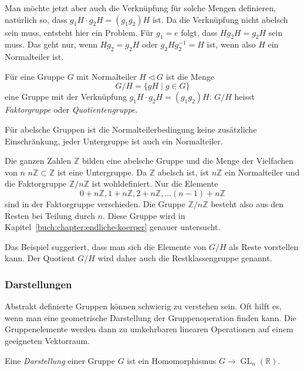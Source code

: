 Man möchte jetzt aber auch die Verknüpfung für solche Mengen 
definieren, natürlich so, dass $g_1H\cdot g_2H = (g_1g_2)H$ ist.
Da die Verknüpfung nicht abelsch sein muss, entsteht hier
ein Problem.
Für $g_1=e$ folgt, dass $Hg_2H=g_2H$ sein muss.
Das geht nur, wenn $Hg_2=g_2H$ oder $g_2Hg_2^{-1}=H$ ist, wenn
also $H$ ein Normalteiler ist.

\begin{definition}
Für eine Gruppe $G$ mit Normalteiler  $H\triangleleft G$ ist die
Menge
\[
G/H = \{ gH \mid g\in G\}
\]
eine Gruppe mit der Verknüpfung $g_1H\cdot g_2H=(g_1g_2)H$.
$G/H$ heisst {\em Faktorgruppe} oder {\em Quotientengruppe}.
%
%
\end{definition}

Für abelsche Gruppen ist die Normalteilerbedingung keine zusätzliche
Einschränkung, jeder Untergruppe ist auch ein Normalteiler.

\begin{beispiel}
Die ganzen Zahlen $\mathbb{Z}$ bilden eine abelsche Gruppe und
die Menge der Vielfachen von $n$
$n\mathbb{Z}\subset\mathbb{Z}$ ist eine Untergruppe.
Da $\mathbb{Z}$ abelsch ist, ist $n\mathbb{Z}$ ein Normalteiler
und die Faktorgruppe $\mathbb{Z}/n\mathbb{Z}$ ist wohldefiniert.
Nur die Elemente
\[
0+n\mathbb{Z},
1+n\mathbb{Z},
2+n\mathbb{Z},
\dots
(n-1)+n\mathbb{Z}
\]
sind in der Faktorgruppe verschieden.
Die Gruppe $\mathbb{Z}/n\mathbb{Z}$ besteht also aus den Resten
bei Teilung durch $n$.
Diese Gruppe wird in Kapitel~\ref{buch:chapter:endliche-koerper}
genauer untersucht.
\end{beispiel}

Das Beispiel suggeriert, dass man sich die Elemente von $G/H$
als Reste vorstellen kann.
Der Quotient $G/H$ wird daher auch die Restklassengruppe genannt.

\subsubsection{Darstellungen}
Abstrakt definierte Gruppen können schwierig zu verstehen sein.
Oft hilft es, wenn man eine geometrische Darstellung der Gruppenoperation
finden kann.
Die Gruppenelemente werden dann zu umkehrbaren linearen Operationen
auf einem geeigneten Vektorraum.

\begin{definition}
\label{buch:vektorenmatrizen:def:darstellung}
Eine {\em Darstellung} einer Gruppe $G$ ist ein Homomorphismus 
$G\to\operatorname{GL}_n(\mathbb{R})$.
\end{definition}

